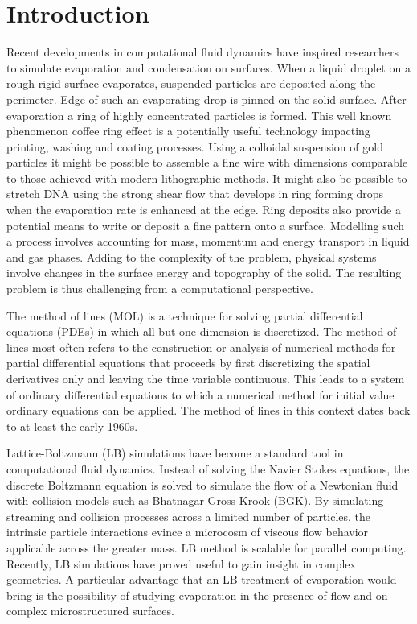 \documentclass[11pt]{article}
\begin{document}
\section{Introduction}
Recent developments in computational fluid dynamics have inspired researchers to simulate evaporation and condensation on surfaces. When a liquid droplet on a rough rigid surface evaporates, suspended particles are deposited along the perimeter. Edge of such an evaporating drop is pinned on the solid surface. After evaporation a ring of highly concentrated particles is formed. This well known phenomenon coffee ring effect is a potentially useful technology impacting printing, washing and coating processes. Using a colloidal suspension of gold particles it might be possible to assemble a fine wire with dimensions comparable to those achieved with modern lithographic methods. It might also be possible to stretch DNA using the strong shear flow that develops in ring forming drops when the evaporation rate is enhanced at the edge.\cite{CoffeeRing} Ring deposits also provide a potential means to write or deposit a fine pattern onto a surface\cite{9dda1ed06b4c4ef7bba2cf98f09e8b8f}. Modelling such a process involves accounting for mass, momentum and energy transport in liquid and gas phases. Adding to the complexity of the problem, physical systems involve changes in the surface energy and topography of the solid. The resulting problem is thus challenging from a computational perspective.

\par
The method of lines (MOL) is a technique for solving partial differential equations (PDEs) in which all but one dimension is discretized. The method of lines most often refers to the construction or analysis of numerical methods for partial differential equations that proceeds by first discretizing the spatial derivatives only and leaving the time variable continuous. This leads to a system of ordinary differential equations to which a numerical method for initial value ordinary equations can be applied. The method of lines in this context dates back to at least the early 1960s.

\par 
Lattice-Boltzmann (LB) simulations have become a standard tool in computational fluid dynamics. Instead of solving the Navier Stokes equations, the discrete Boltzmann equation is solved to simulate the flow of a Newtonian fluid with collision models such as Bhatnagar Gross Krook (BGK). By simulating streaming and collision processes across a limited number of particles, the intrinsic particle interactions evince a microcosm of viscous flow behavior applicable across the greater mass. LB method is scalable for parallel computing. Recently, LB simulations have proved useful to gain insight in complex geometries. A particular advantage that an LB treatment of evaporation would bring is the possibility of studying evaporation in the presence of flow and on complex microstructured surfaces.
\end{document}
